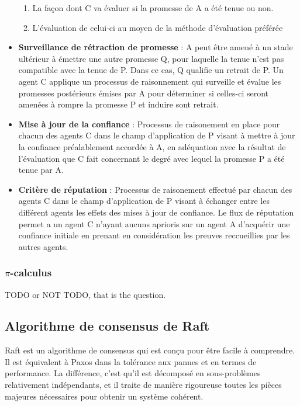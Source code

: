 \begin{itemize}
\begin{enumerate}
	  \item La façon dont C va évaluer si la promesse de A a été tenue ou
		  non.
	  \item L'évaluation de celui-ci au moyen de la méthode d'évaluation
		  préférée
  	\end{enumerate}
  \item \textbf{Surveillance de rétraction de promesse} :
	A peut être amené à un stade ultérieur à émettre une autre promesse Q,
	pour laquelle la tenue n'est pas compatible avec la tenue de P. Dans ce
	cas, Q qualifie un retrait de P. Un agent C applique un processus de
	raisonnement qui surveille et évalue les promesses postérieurs émises
	par A pour déterminer si celles-ci seront amenées à rompre la promesse P
	et induire sont retrait.
  \item \textbf{Mise à jour de la confiance} :
	Processus de raisonement en place pour chacun des agents C dans le champ
	d'application de P visant à mettre à jour la confiance préalablement
	accordée à A, en adéquation avec la résultat de l'évaluation que C fait
	concernant le degré avec lequel la promesse P a été tenue par A.
  \item \textbf{Critère de réputation} :
	Processus de raisonement effectué par chacun des agents C dans le champ
	d'application de P visant à échanger entre les différent agents les
	effets des mises à jour de confiance. Le flux de réputation permet a un
	agent C n'ayant aucuns aprioris sur un agent A d'acquérir une confiance
	initiale en prenant en considération les preuves reccueillies par les
	autres agents.
\end{itemize}

\subsubsection{$\pi$-calculus}

TODO or NOT TODO, that is the question.

\subsection{Algorithme de consensus de Raft}

Raft est un algorithme de consensus qui est conçu pour être facile à comprendre.
Il est équivalent à Paxos dans la tolérance aux pannes et en termes de
performance. La différence, c'est qu'il est décomposé en sous-problèmes
relativement indépendants, et il traite de manière rigoureuse toutes les pièces
majeures nécessaires pour obtenir un système cohérent.

